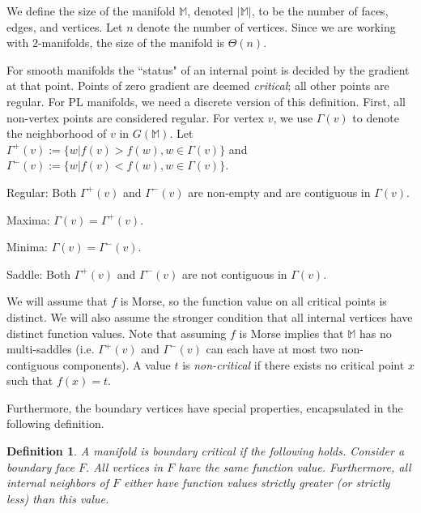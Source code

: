 \documentclass[11pt]{article}
\newtheorem{definition}[theorem]{Definition}
\theoremstyle{definition}
\newcommand{\innbd}{\Gamma^-}
\newcommand{\nbd}{\Gamma}
\newcommand{\outnbd}{\Gamma^+}
\newcommand{\MM}{\mathbb{M}}
\begin{document}
{We define the size of the manifold $\MM$, denoted $|\MM|$, to be the number of faces, edges, and vertices.  
Let $n$ denote the number of vertices.  
Since we are working with $2$-manifolds, the size of the manifold is $\Theta(n)$.

For smooth manifolds the ``status" of an internal point is decided by the gradient at that point. 
Points of zero gradient are deemed \emph{critical};
all other points are regular.
For PL manifolds, we need a discrete version of this definition.
First, all non-vertex points are considered regular.
For vertex $v$, we use $\nbd(v)$ to denote the neighborhood of $v$ in $G(\MM)$. Let $\outnbd(v) := \{ w | f(v) > f(w), w \in \Gamma(v)\}$
and $\innbd(v) := \{w | f(v) < f(w), w \in \Gamma(v)\}$. 
\smallskip
\begin{asparaenum}
	\item Regular: Both $\outnbd(v)$ and $\innbd(v)$ are non-empty and are contiguous in $\nbd(v)$.
	\item Maxima: $\nbd(v) = \outnbd(v)$.
	\item Minima: $\nbd(v) = \innbd(v)$.
	\item Saddle: Both $\outnbd(v)$ and $\innbd(v)$ are not contiguous in $\nbd(v)$.
\end{asparaenum}
\smallskip

We will assume that $f$ is Morse, so the function value on all critical points is distinct. 
We will also assume the stronger condition that all internal vertices have distinct function values.
Note that assuming $f$ is Morse implies that $\MM$ has no multi-saddles 
(i.e. $\outnbd(v)$ and $\innbd(v)$ can each have at most two non-contiguous components).
A value $t$ is \emph{non-critical} if there exists no critical point $x$ such that $f(x) = t$.

Furthermore, the boundary vertices have special properties, encapsulated in the following definition.

\begin{definition} \label{def:bound} A manifold is \emph{boundary critical} if the following holds.
Consider a boundary face $F$. All vertices in $F$ have the same function value. Furthermore, all
internal neighbors of $F$ either have function values strictly greater (or strictly less)
than this value.
\end{definition}

}
\end{document}
